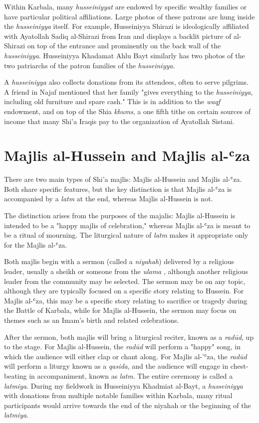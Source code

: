 Within Karbala, many \emph{husseiniyyat} are endowed by specific wealthy families or have particular political affiliations. Large photos of these patrons are hung inside the \emph{husseiniyya} itself. For example, Husseiniyya Shirazi is ideologically affiliated with Ayatollah Sadiq al-Shirazi from Iran and displays a backlit picture of al-Shirazi on top of the entrance and prominently on the back wall of the \emph{husseiniyya}. Husseiniyya Khadamat Ahlu Bayt similarly has two photos of the two patriarchs of the patron families of the \emph{husseiniyya}.

A \emph{husseiniyya} also collects donations from its attendees, often to serve pilgrims. A friend in Najaf mentioned that her family "gives everything to the \emph{husseiniyya}, including old furniture and spare cash." This is in addition to the \emph{waqf} endowment, and on top of the Shia \emph{khums}, a one fifth tithe on certain sources of income that many Shi'a Iraqis pay to the organization of Ayatollah Sistani.

\section{Majlis al-Hussein and Majlis al-ʿza}
There are two main types of Shi'a majlis: Majlis al-Hussein and Majlis al-ʿza. Both share specific features, but the key distinction is that Majlis al-ʿza is accompanied by a \emph{latm} at the end, whereas Majlis al-Hussein is not.

The distinction arises from the purposes of the majalis: Majlis al-Hussein is intended to be a "happy majlis of celebration," \cite{al-husseini_interview_2022} whereas Majlis al-ʿza is meant to be a ritual of mourning. The liturgical nature of \emph{latm} makes it appropriate only for the Majlis al-ʿza.

Both majlis begin with a sermon (called a \emph{niyahah}) delivered by a religious leader, usually a sheikh or someone from the \emph{ulama} \cite{hamdan_development_2012}, although another religious leader from the community may be selected. The sermon may be on any topic, although they are typically focused on a specific story relating to Hussein. For Majlis al-ʿza, this may be a specific story relating to sacrifice or tragedy during the Battle of Karbala, while for Majlis al-Hussein, the sermon may focus on themes such as an Imam's birth and related celebrations.

After the sermon, both majlis will bring a liturgical reciter, known as a \emph{radūd}, up to the stage. For Majlis al-Hussein, the \emph{radūd} will perform a "happy" song, in which the audience will either clap or chant along. For Majlis al-'ʿza, the \emph{radūd} will perform a liturgy known as a \emph{qasida}, and the audience will engage in chest-beating in accompaniment, known as \emph{latm}. The entire ceremony is called a \emph{latmiya}. During my fieldwork in Husseiniyya Khadmiat al-Bayt, a \emph{husseiniyya} with donations from multiple notable families within Karbala, many ritual participants would arrive towards the end of the niyahah or the beginning of the \emph{latmiya}.


